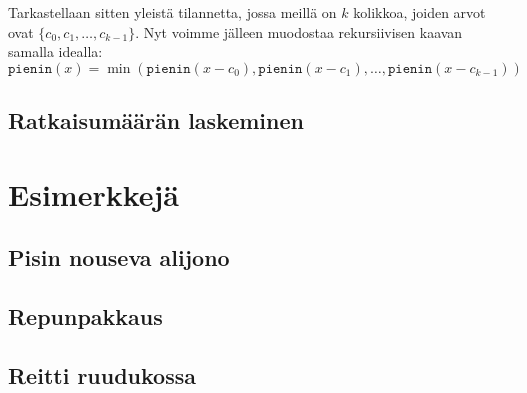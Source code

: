Tarkastellaan sitten yleistä tilannetta, jossa meillä on $k$ kolikkoa,
joiden arvot ovat $\{c_0,c_1,\ldots,c_{k-1}\}$.
Nyt voimme jälleen muodostaa rekursiivisen kaavan samalla idealla:
\[
\texttt{pienin}(x) =
    \min(\texttt{pienin}(x-c_0),\texttt{pienin}(x-c_1),\dots,\texttt{pienin}(x-c_{k-1}))
\]



\subsection{Ratkaisumäärän laskeminen}

\section{Esimerkkejä}

\subsection{Pisin nouseva alijono}

\subsection{Repunpakkaus}

\subsection{Reitti ruudukossa}
